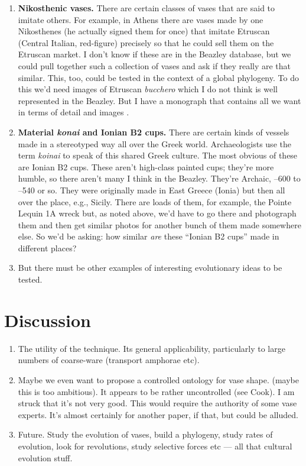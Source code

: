 \documentclass[onecolumn,10pt]{article}
\begin{document}
\begin{enumerate}
\item \textbf{Nikosthenic vases.} There are certain classes of vases that are said to imitate others. For example, in Athens there are vases made by one Nikosthenes (he actually signed them for once) that imitate Etruscan (Central Italian, red-figure) precisely so that he could sell them on the Etruscan market. I don't know if these are in the Beazley database, but we could pull together such a collection of vases and ask if they really are that similar.  This, too, could be tested in the context of a global phylogeny. To do this we'd need images of Etruscan \emph{bucchero} which I do not think is well represented in the Beazley. But I have a monograph that contains all we want in terms of detail and images \parencite{Tosto1999}.

\item \textbf{Material \emph{konai} and Ionian B2 cups.} There are certain kinds of vessels made in a stereotyped way all over the Greek world. Archaeologists use the term \emph{koinai} to speak of this shared Greek culture. The most obvious of these are Ionian B2 cups. These aren't high-class painted cups; they're more humble, so there aren't many I think in the Beazley. They're Archaic, --600 to --540 or so. They were originally made in East Greece (Ionia) but then all over the place, e.g., Sicily.  There are loads of them, for example, the Pointe Lequin 1A wreck but, as noted above, we'd have to go there and photograph them and then get similar photos for another bunch of them made somewhere else. So we'd be asking: how similar \emph{are} these ``Ionian B2 cups'' made in different places? 
\item But there must be other examples of interesting evolutionary ideas to be tested. 
\end{enumerate}

\clearpage

\section*{Discussion}
\begin{enumerate}
\item The utility of the technique.  Its general applicability, particularly to large numbers of coarse-ware (transport amphorae etc). 
\item Maybe we even want to propose a controlled ontology for vase shape. (maybe this is too ambitious). It appears to be rather uncontrolled (see Cook). I am struck that it's not very good. This would require the authority of some vase experts. It's almost certainly for another paper, if that, but could be alluded. 
\item Future. Study the evolution of vases, build a phylogeny, study rates of evolution, look for revolutions, study selective forces etc --- all that cultural evolution stuff. 

\end{enumerate}
\printbibliography
\clearpage
\end{document}
